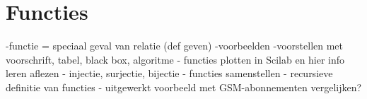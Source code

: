 \chapter{Functies}
\label{chap:functies}

-functie = speciaal geval van relatie (def geven)
-voorbeelden
-voorstellen met voorschrift, tabel, black box, algoritme
- functies plotten in Scilab en hier info leren aflezen
- injectie, surjectie, bijectie
- functies samenstellen
- recursieve definitie van functies
- uitgewerkt voorbeeld met GSM-abonnementen vergelijken?